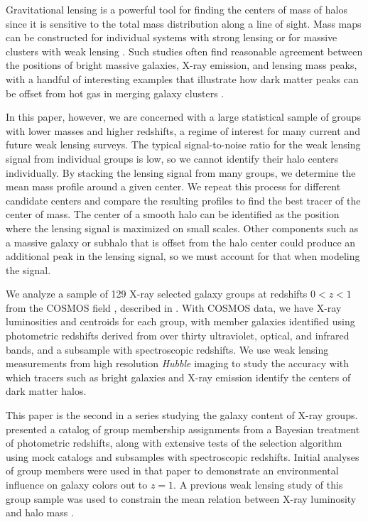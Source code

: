 Gravitational lensing is a powerful tool for finding the centers of mass of halos
since it is sensitive to the total mass distribution along a line of
sight. Mass maps can be constructed for individual systems with strong
lensing or for massive clusters with weak lensing
\citep[e.g.,][]{Smith2005b, Oguri2010, Shan2010}. Such studies often 
find reasonable agreement between the positions of bright massive
galaxies, X-ray emission, and lensing mass peaks, with a handful of
interesting examples that illustrate how dark matter peaks can be
offset from hot gas in merging galaxy clusters
\citep[e.g.,][]{Clowe2004, Bradac2008}. 

In this paper, however, we are concerned with a large statistical
sample of groups with lower masses and higher redshifts, a regime of
interest for many current and future weak lensing surveys. The typical
signal-to-noise ratio for the weak lensing signal from individual groups is
low, so we cannot identify their halo centers individually. By stacking
the lensing signal from many groups, we determine the mean mass
profile around a given center. We repeat this process for
different candidate centers and compare the resulting profiles to find
the best tracer of the center of mass.
The center of a smooth halo can be identified as the position where
the lensing signal is maximized on small scales. Other components such
as a massive galaxy or subhalo that is offset from the halo center
could produce an additional peak in the lensing signal, so we must
account for that when modeling the signal.

We analyze a sample of 129 X-ray selected galaxy groups at redshifts
$0<z<1$ from the COSMOS field \citep{Scoville2007a}, described in
\citet{George2011}.  With 
COSMOS data, we have X-ray luminosities and centroids for each group,
with member galaxies identified using photometric redshifts derived
from over thirty ultraviolet, optical, and infrared bands, and a
subsample with spectroscopic redshifts. We use weak lensing
measurements from high resolution \textit{Hubble} imaging to study the
accuracy with which tracers such as bright galaxies and X-ray emission
identify the centers of dark matter halos.

This paper is the second in a series studying the galaxy content of
X-ray groups. \citet[][hereafter Paper~I]{George2011} presented a
catalog of group membership assignments from a Bayesian treatment of
photometric redshifts, along with extensive tests of the selection
algorithm using mock catalogs and subsamples with spectroscopic
redshifts. Initial analyses of group members were used in that paper
to demonstrate an environmental influence on galaxy colors out to
$z=1$. A previous weak lensing study of this group sample was used to
constrain the mean relation between X-ray luminosity and halo mass
\citep{Leauthaud2010}. 

